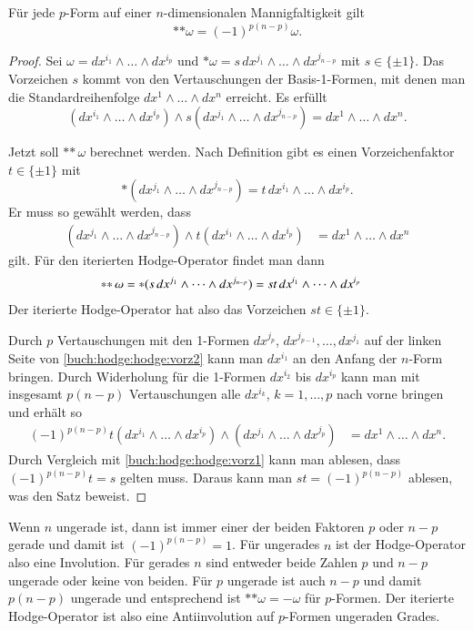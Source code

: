 \begin{satz}
Für jede $p$-Form auf einer $n$-dimensionalen Mannigfaltigkeit gilt
\[
\ast{\ast \omega}
=
(-1)^{p(n-p)}\omega.
\]
\end{satz}

\begin{proof}
Sei $\omega = dx^{i_1}\wedge\dots\wedge dx^{i_p}$ und 
$\ast\omega = s\,dx^{j_1}\wedge\dots\wedge dx^{j_{n-p}}$ mit
$s\in\{\pm 1\}$.
Das Vorzeichen $s$ kommt von den Vertauschungen der Basis-1-Formen,
mit denen man die Standardreihenfolge $dx^1\wedge \dots\wedge dx^n$
erreicht.
Es erfüllt
\begin{equation}
(dx^{i_1}\wedge\dots\wedge dx^{i_p})
\wedge
s(dx^{j_1}\wedge\dots\wedge dx^{j_{n-p}})
=
dx^1\wedge\dots\wedge dx^n.
\label{buch:hodge:hodge:vorz1}
\end{equation}

Jetzt soll $\ast{\ast\,\omega}$ berechnet werden.
Nach Definition gibt es einen Vorzeichenfaktor $t\in\{\pm1\}$ mit
\[
\ast(dx^{j_1}\wedge\dots\wedge dx^{j_{n-p}})
=
t\,dx^{i_1}\wedge\dots\wedge dx^{i_p}.
\]
Er muss so gewählt werden, dass
\begin{align}
(dx^{j_1}\wedge\dots\wedge dx^{j_{n-p}})
\wedge
t(dx^{i_1}\wedge\dots\wedge dx^{i_p})
&=
dx^1\wedge\dots\wedge dx^n
\label{buch:hodge:hodge:vorz2}
\end{align}
gilt.
Für den iterierten Hodge-Operator findet man dann
\begin{align}
\ast{\ast\, \omega}
=
\ast(s\,dx^{j_1}\wedge\dots\wedge dx^{j_{n-p}})
&=
st\, dx^{i_1}\wedge\dots\wedge dx^{i_p}
\notag
\end{align}
Der iterierte Hodge-Operator hat also das Vorzeichen $st\in\{\pm 1\}$.

Durch $p$ Vertauschungen mit den 1-Formen $dx^{j_p}$,
$dx^{j_{p-1}},\dots,dx^{j_1}$ auf der linken Seite von
\eqref{buch:hodge:hodge:vorz2}
kann man $dx^{i_1}$ an den Anfang
der $n$-Form bringen.
Durch Widerholung für die 1-Formen $dx^{i_2}$ bis $dx^{i_p}$ kann
man mit insgesamt $p(n-p)$ Vertauschungen alle $dx^{i_k}$, $k=1,\dots,p$
nach vorne bringen und erhält so
\begin{align}
(-1)^{p(n-p)}
t(dx^{i_1}\wedge\dots\wedge dx^{i_p})
\wedge
(dx^{j_1}\wedge\dots\wedge dx^{j_p})
&=
dx^1\wedge\dots\wedge dx^n.
\end{align}
Durch Vergleich mit 
\eqref{buch:hodge:hodge:vorz1}
kann man ablesen, dass $(-1)^{p(n-p)}t=s$ gelten muss.
Daraus kann man
$st=(-1)^{p(n-p)}$ ablesen, was den Satz beweist.
\end{proof}

Wenn $n$ ungerade ist, dann ist immer einer der beiden Faktoren $p$
oder $n-p$ gerade und damit ist $(-1)^{p(n-p)}=1$.
Für ungerades $n$ ist der Hodge-Operator also eine Involution.
%
Für gerades $n$ sind entweder beide Zahlen $p$ und $n-p$ ungerade
oder keine von beiden.
Für $p$ ungerade ist auch $n-p$ und damit $p(n-p)$ ungerade
und entsprechend ist $\ast{\ast\omega}=-\omega$ für $p$-Formen.
Der iterierte Hodge-Operator ist also eine Antiinvolution auf
$p$-Formen ungeraden Grades.

